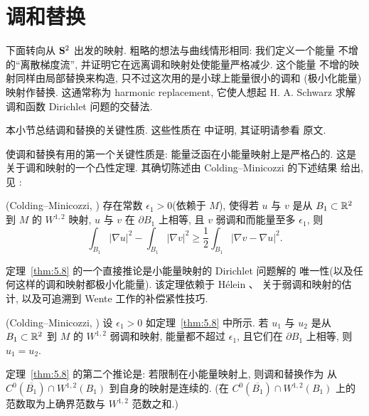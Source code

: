 \section{调和替换}
\label{sec:5.4}

下面转向从 $\mathbf{S}^2$ 出发的映射. 粗略的想法与曲线情形相同: 我们定义一个能量
不增的``离散梯度流'', 并证明它在远离调和映射处使能量严格减少. 这个能量
不增的映射同样由局部替换来构造, 只不过这次用的是小球上能量很小的调和
(极小化能量)映射作替换. 这通常称为%
{harmonic replacement}, 它使人想起 H. A. Schwarz 求解调和函数
Dirichlet 问题的交替法.

本小节总结调和替换的关键性质. 这些性质在 \cite{CM27} 中证明, 其证明请参看
原文.

使调和替换有用的第一个关键性质是: 能量泛函在小能量映射上是严格凸的. 这是
关于调和映射的一个凸性定理. 其确切陈述由 Colding--Minicozzi 的下述结果
给出, 见 \cite{CM27}:

\begin{theorem}
\label{thm:5.8}
(Colding--Minicozzi, \cite{CM27}) 存在常数 $\epsilon_1>0$(依赖于 $M$),
使得若 $u$ 与 $v$ 是从 $B_1\subset\mathbb{R}^2$ 到 $M$ 的 $W^{1,2}$ 映射, $u$
与 $v$ 在 $\partial B_1$ 上相等, 且 $v$ 弱调和而能量至多 $\epsilon_1$, 则
\begin{equation}
\int_{B_1}|\nabla u|^2-\int_{B_1}|\nabla v|^2
\geq\frac12\int_{B_1}|\nabla v-\nabla u|^2.
\label{eq:5.33}
\end{equation}
\end{theorem}

定理~\ref{thm:5.8} 的一个直接推论是小能量映射的 Dirichlet 问题解的
唯一性(以及任何这样的调和映射都极小化能量). 该定理依赖于 H\'elein
\cite{Hf1}、\cite{Hf2} 关于弱调和映射的估计, 以及可追溯到 Wente
\cite{W} 工作的补偿紧性技巧.

\begin{corollary}
\label{cor:5.9}
(Colding--Minicozzi, \cite{CM27}) 设 $\epsilon_1>0$ 如定理~\ref{thm:5.8}
中所示. 若 $u_1$ 与 $u_2$ 是从 $B_1\subset\mathbb{R}^2$ 到 $M$ 的 $W^{1,2}$
弱调和映射, 能量都不超过 $\epsilon_1$, 且它们在 $\partial B_1$ 上相等,
则 $u_1=u_2$.
\end{corollary}

定理~\ref{thm:5.8} 的第二个推论是: 若限制在小能量映射上, 则调和替换作为
从 $C^0(\overline{B_1})\cap W^{1,2}(B_1)$ 到自身的映射是连续的. (在
$C^0(\overline{B_1})\cap W^{1,2}(B_1)$ 上的范数取为上确界范数与
$W^{1,2}$ 范数之和.)

